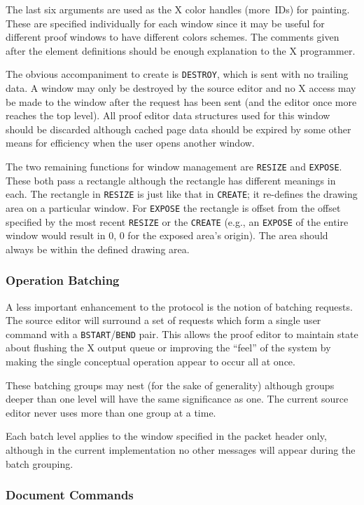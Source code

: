 The last six arguments are used as the X color handles (more~IDs) for
painting.  These are specified individually for each window since it
may be useful for different proof windows to have different colors
schemes.  The comments given after the element definitions should be
enough explanation to the X programmer.

The obvious accompaniment to create is {\tt DESTROY}, which is sent
with no trailing data.  A window may only be destroyed by the source
editor and no X access may be made to the window after the request
has been sent (and the editor once more reaches the top level).  All
proof editor data structures used for this window should be discarded
although cached page data should be expired by some other means for
efficiency when the user opens another window.

The two remaining functions for window management are {\tt RESIZE}
and {\tt EXPOSE}.  These both pass a rectangle although the rectangle
has different meanings in each.  The rectangle in {\tt RESIZE} is
just like that in {\tt CREATE}; it re-defines the drawing area on a
particular window.  For {\tt EXPOSE} the rectangle is offset from the
offset specified by the most recent {\tt RESIZE} or the {\tt CREATE}
(e.g., an {\tt EXPOSE} of the entire window would result in 0, 0 for
the exposed area's origin).  The area should always be within the
defined drawing area.

\subsubsection{Operation Batching}

A less important enhancement to the protocol is the notion of batching
requests.  The source editor will surround a set of requests which
form a single user command with a {\tt BSTART}/{\tt BEND} pair.  This
allows the proof editor to maintain state about flushing the X output
queue or improving the ``feel'' of the system by making the single
conceptual operation appear to occur all at once.

These batching groups may nest (for the sake of generality) although
groups deeper than one level will have the same significance as one.
The current source editor never uses more than one group at a time.

Each batch level applies to the window specified in the packet header
only, although in the current implementation no other messages will appear
during the batch grouping.

\subsubsection{Document Commands}

